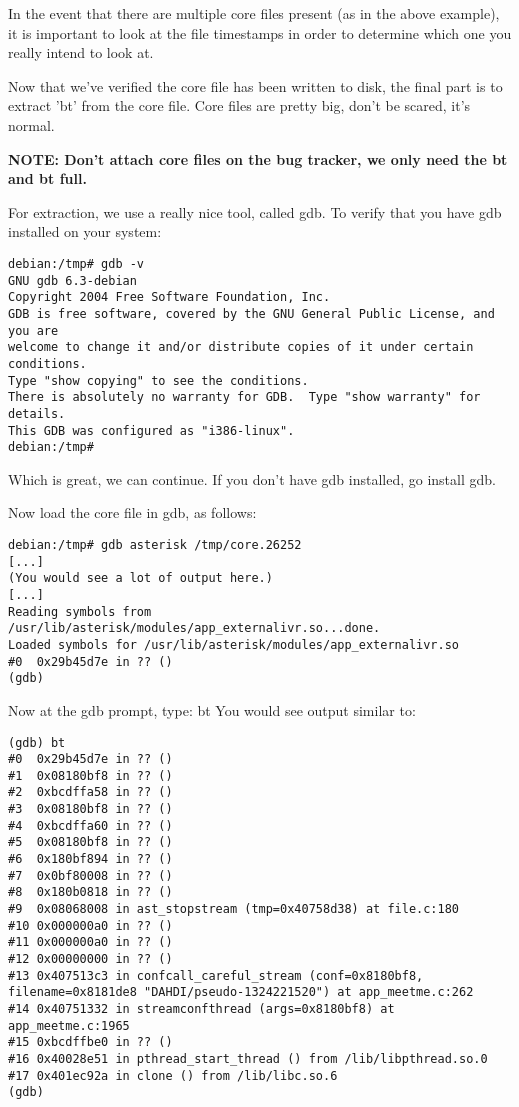In the event that there are multiple core files present (as in the
above example), it is important to look at the file timestamps in
order to determine which one you really intend to look at.

Now that we've verified the core file has been written to disk, the
final part is to extract 'bt' from the core file. Core files are
pretty big, don't be scared, it's normal.

\textbf{NOTE: Don't attach core files on the bug tracker, we only need the bt and bt full.}

For extraction, we use a really nice tool, called gdb. To verify that
you have gdb installed on your system:

\begin{astlisting}
\begin{verbatim}
debian:/tmp# gdb -v
GNU gdb 6.3-debian
Copyright 2004 Free Software Foundation, Inc.
GDB is free software, covered by the GNU General Public License, and you are
welcome to change it and/or distribute copies of it under certain conditions.
Type "show copying" to see the conditions.
There is absolutely no warranty for GDB.  Type "show warranty" for details.
This GDB was configured as "i386-linux".
debian:/tmp#
\end{verbatim}
\end{astlisting}

Which is great, we can continue. If you don't have gdb installed, go install gdb.

Now load the core file in gdb, as follows:

\begin{astlisting}
\begin{verbatim}
debian:/tmp# gdb asterisk /tmp/core.26252
[...]
(You would see a lot of output here.)
[...]
Reading symbols from /usr/lib/asterisk/modules/app_externalivr.so...done.
Loaded symbols for /usr/lib/asterisk/modules/app_externalivr.so
#0  0x29b45d7e in ?? ()
(gdb)
\end{verbatim}
\end{astlisting}

Now at the gdb prompt, type: bt
You would see output similar to:

\begin{astlisting}
\begin{verbatim}
(gdb) bt
#0  0x29b45d7e in ?? ()
#1  0x08180bf8 in ?? ()
#2  0xbcdffa58 in ?? ()
#3  0x08180bf8 in ?? ()
#4  0xbcdffa60 in ?? ()
#5  0x08180bf8 in ?? ()
#6  0x180bf894 in ?? ()
#7  0x0bf80008 in ?? ()
#8  0x180b0818 in ?? ()
#9  0x08068008 in ast_stopstream (tmp=0x40758d38) at file.c:180
#10 0x000000a0 in ?? ()
#11 0x000000a0 in ?? ()
#12 0x00000000 in ?? ()
#13 0x407513c3 in confcall_careful_stream (conf=0x8180bf8, filename=0x8181de8 "DAHDI/pseudo-1324221520") at app_meetme.c:262
#14 0x40751332 in streamconfthread (args=0x8180bf8) at app_meetme.c:1965
#15 0xbcdffbe0 in ?? ()
#16 0x40028e51 in pthread_start_thread () from /lib/libpthread.so.0
#17 0x401ec92a in clone () from /lib/libc.so.6
(gdb)
\end{verbatim}
\end{astlisting}

